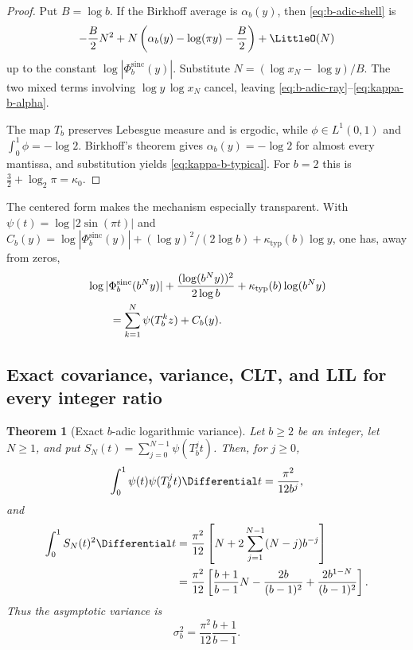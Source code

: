 \documentclass[11pt,oneside]{article}
\numberwithin{equation}{section}
\newtheorem{theorem}{Theorem}[section]
\theoremstyle{definition}
\theoremstyle{remark}
\newcommand{\GeometricSincProduct}[1]{\Phi^{\mathrm{sinc}}_{#1}}
\begin{document}
\begin{proof}
Put $B=\log b$.  If the Birkhoff average is $\alpha_b(y)$, then
\eqref{eq:b-adic-shell} is
\[
 -\frac B2N^2
 +N\left(\alpha_b(y)-\log(\pi y)-\frac B2\right)+\LittleO(N)
\]
up to the constant $\log|\GeometricSincProduct{b}(y)|$.  Substitute
$N=(\log x_N-\log y)/B$.  The two mixed terms involving
$\log y\,\log x_N$ cancel, leaving
\eqref{eq:b-adic-ray}--\eqref{eq:kappa-b-alpha}.

The map $T_b$ preserves Lebesgue measure and is ergodic, while
$\phi\in L^1(0,1)$ and $\int_0^1\phi=-\log2$.  Birkhoff's theorem gives
$\alpha_b(y)=-\log2$ for almost every mantissa, and substitution yields
\eqref{eq:kappa-b-typical}.  For $b=2$ this is
$\tfrac32+\log_2\pi=\kappa_0$.
\end{proof}

The centered form makes the mechanism especially transparent.  With
$\psi(t)=\log|2\sin(\pi t)|$ and
$C_b(y)=\log|\GeometricSincProduct{b}(y)|+(\log y)^2/(2\log b)
+\kappa_{\mathrm{typ}}(b)\log y$, one has, away from zeros,
\begin{align}
 &\log|\GeometricSincProduct{b}(b^Ny)|
 +\frac{(\log(b^Ny))^2}{2\log b}
 +\kappa_{\mathrm{typ}}(b)\log(b^Ny) \notag\\
 &\qquad=\sum_{k=1}^{N}\psi(T_b^kz)+C_b(y).
 \label{eq:b-adic-centered}
\end{align}

\subsection{Exact covariance, variance, CLT, and LIL for every integer ratio}

\begin{theorem}[Exact $b$-adic logarithmic variance]
\label{thm:b-adic-variance}
Let $b\ge2$ be an integer, let $N\ge1$, and put
$S_N(t)=\sum_{j=0}^{N-1}\psi(T_b^jt)$.  Then, for
$j\ge0$,
\begin{equation}
 \int_0^1\psi(t)\psi(T_b^jt)\Differential t=\frac{\pi^2}{12b^j},
 \label{eq:b-adic-covariance}
\end{equation}
and
\begin{align}
 \int_0^1S_N(t)^2\Differential t
 &=\frac{\pi^2}{12}
 \left[N+2\sum_{j=1}^{N-1}(N-j)b^{-j}\right] \notag\\
 &=\frac{\pi^2}{12}
 \left[\frac{b+1}{b-1}N-\frac{2b}{(b-1)^2}
       +\frac{2b^{1-N}}{(b-1)^2}\right].
 \label{eq:b-adic-variance}
\end{align}
Thus the asymptotic variance is
\begin{equation}
 \boxed{\displaystyle
 \sigma_b^2=\frac{\pi^2}{12}\frac{b+1}{b-1}.}
 \label{eq:b-adic-asymptotic-variance}
\end{equation}
\end{theorem}
\end{document}
